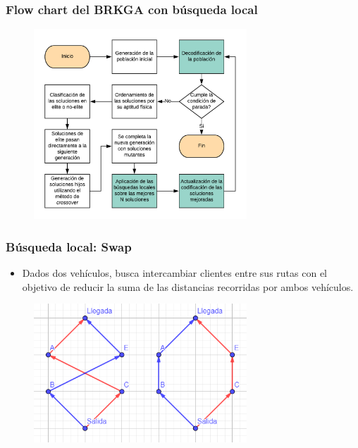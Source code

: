 \documentclass{beamer}
\begin{document}
\begin{frame}
\frametitle{Flow chart del BRKGA con búsqueda local}

\begin{figure}[h]
	\centering
	\includegraphics[width=8cm]{BRKGA_Flow_Chart_Implementado}
	\label{fig:BRKGA_Flow_Chart_Implementado}
\end{figure}

\end{frame}


\begin{frame}
\frametitle{Búsqueda local: Swap}

\begin{itemize}
    \item Dados dos vehículos, busca intercambiar clientes entre sus rutas con el objetivo de reducir la suma de las distancias recorridas por ambos vehículos.
\end{itemize}

\begin{figure}[h]
	\centering
	\includegraphics[width=8cm]{blswap}
	\label{fig:blswap}
\end{figure}

\end{frame}
\end{document}

